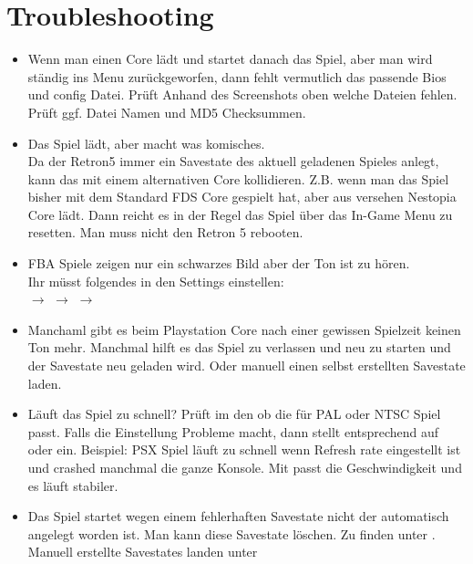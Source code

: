 \documentclass[german]{retronlabo-manual}
\begin{document}

\section{Troubleshooting}

\begin{itemize}
  \item Wenn man einen Core l\"adt und startet danach das Spiel, aber man wird st\"andig ins Menu zur\"uckgeworfen, dann fehlt vermutlich das passende Bios und config Datei. Pr\"uft Anhand des Screenshots oben welche Dateien fehlen. Pr\"uft ggf. Datei Namen und MD5 Checksummen.
  \item Das Spiel l\"adt, aber macht was komisches. \\
Da der Retron5 immer ein Savestate des aktuell geladenen Spieles anlegt, kann das mit einem alternativen Core kollidieren. Z.B. wenn man das Spiel bisher mit dem Standard FDS Core gespielt hat, aber aus versehen Nestopia Core l\"adt. Dann reicht es in der Regel das Spiel \"uber das In-Game Menu zu resetten. Man muss nicht den Retron 5 rebooten.
  \item FBA Spiele zeigen nur ein schwarzes Bild aber der Ton ist zu h\"oren. \\
Ihr m\"usst folgendes in den Settings einstellen: \\
 $\rightarrow$  $\rightarrow$  $\rightarrow$ 
  \item Manchaml gibt es beim Playstation Core nach einer gewissen Spielzeit keinen Ton mehr. Manchmal hilft es das Spiel zu verlassen und neu zu starten und der Savestate neu geladen wird. Oder manuell einen selbst erstellten Savestate laden.
  \item L\"auft das Spiel zu schnell? Pr\"uft im den  ob die  f\"ur PAL oder NTSC Spiel passt. Falls die Einstellung  Probleme macht, dann stellt entsprechend auf  oder  ein. Beispiel: PSX Spiel  l\"auft zu schnell wenn  Refresh rate eingestellt ist und crashed manchmal die ganze Konsole. Mit  passt die Geschwindigkeit und es l\"auft stabiler.
  \item Das Spiel startet wegen einem fehlerhaften Savestate nicht der automatisch angelegt worden ist. Man kann diese Savestate  l\"oschen. Zu finden unter . Manuell erstellte Savestates landen unter 
\end{itemize}
\end{document}
